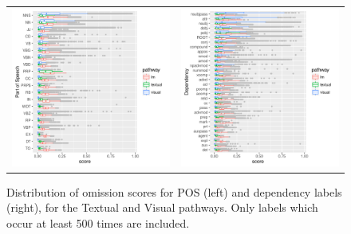 \label{subsec:omission-text-vis}
\begin{figure}[t]
\setlength{\tabcolsep}{0pt}
  \begin{tabular}{cc}
  \includegraphics[scale=0.6]{imaginet-omission-pos-boxplot.png} &
  \includegraphics[scale=0.6]{imaginet-omission-dep-boxplot.png} \\
  \end{tabular}
  
\caption{Distribution of omission scores for POS (left) and dependency labels
  (right), for the {\sc Textual} and {\sc Visual} pathways. Only labels which occur at least 500 times are included.}
\label{fig:omission-imaginet}
\end{figure}

